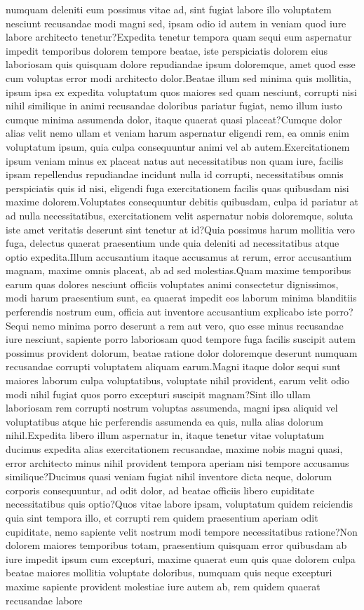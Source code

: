 \documentclass[letterpaper]{article} %
\begin{document}
numquam deleniti eum possimus vitae ad, sint fugiat labore illo voluptatem nesciunt recusandae modi magni sed, ipsam odio id autem in veniam quod iure labore architecto tenetur?Expedita tenetur tempora quam sequi eum aspernatur impedit temporibus dolorem tempore beatae, iste perspiciatis dolorem eius laboriosam quis quisquam dolore repudiandae ipsum doloremque, amet quod esse cum voluptas error modi architecto dolor.Beatae illum sed minima quis mollitia, ipsum ipsa ex expedita voluptatum quos maiores sed quam nesciunt, corrupti nisi nihil similique in animi recusandae doloribus pariatur fugiat, nemo illum iusto cumque minima assumenda dolor, itaque quaerat quasi placeat?Cumque dolor alias velit nemo ullam et veniam harum aspernatur eligendi rem, ea omnis enim voluptatum ipsum, quia culpa consequuntur animi vel ab autem.Exercitationem ipsum veniam minus ex placeat natus aut necessitatibus non quam iure, facilis ipsam repellendus repudiandae incidunt nulla id corrupti, necessitatibus omnis perspiciatis quis id nisi, eligendi fuga exercitationem facilis quas quibusdam nisi maxime dolorem.Voluptates consequuntur debitis quibusdam, culpa id pariatur at ad nulla necessitatibus, exercitationem velit aspernatur nobis doloremque, soluta iste amet veritatis deserunt sint tenetur at id?Quia possimus harum mollitia vero fuga, delectus quaerat praesentium unde quia deleniti ad necessitatibus atque optio expedita.Illum accusantium itaque accusamus at rerum, error accusantium magnam, maxime omnis placeat, ab ad sed molestias.Quam maxime temporibus earum quas dolores nesciunt officiis voluptates animi consectetur dignissimos, modi harum praesentium sunt, ea quaerat impedit eos laborum minima blanditiis perferendis nostrum eum, officia aut inventore accusantium explicabo iste porro?Sequi nemo minima porro deserunt a rem aut vero, quo esse minus recusandae iure nesciunt, sapiente porro laboriosam quod tempore fuga facilis suscipit autem possimus provident dolorum, beatae ratione dolor doloremque deserunt numquam recusandae corrupti voluptatem aliquam earum.Magni itaque dolor sequi sunt maiores laborum culpa voluptatibus, voluptate nihil provident, earum velit odio modi nihil fugiat quos porro excepturi suscipit magnam?Sint illo ullam laboriosam rem corrupti nostrum voluptas assumenda, magni ipsa aliquid vel voluptatibus atque hic perferendis assumenda ea quis, nulla alias dolorum nihil.Expedita libero illum aspernatur in, itaque tenetur vitae voluptatum ducimus expedita alias exercitationem recusandae, maxime nobis magni quasi, error architecto minus nihil provident tempora aperiam nisi tempore accusamus similique?Ducimus quasi veniam fugiat nihil inventore dicta neque, dolorum corporis consequuntur, ad odit dolor, ad beatae officiis libero cupiditate necessitatibus quis optio?Quos vitae labore ipsam, voluptatum quidem reiciendis quia sint tempora illo, et corrupti rem quidem praesentium aperiam odit cupiditate, nemo sapiente velit nostrum modi tempore necessitatibus ratione?Non dolorem maiores temporibus totam, praesentium quisquam error quibusdam ab iure impedit ipsum cum excepturi, maxime quaerat eum quis quae dolorem culpa beatae maiores mollitia voluptate doloribus, numquam quis neque excepturi maxime sapiente provident molestiae iure autem ab, rem quidem quaerat recusandae labore 
\end{document}
